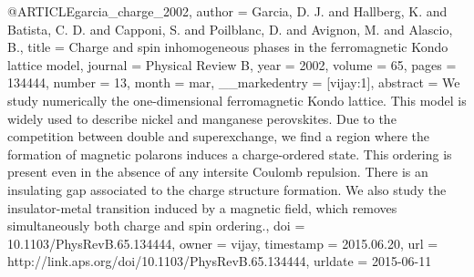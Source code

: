 @ARTICLE{garcia_charge_2002,
  author = {Garcia, D. J. and Hallberg, K. and Batista, C. D. and Capponi, S.
	and Poilblanc, D. and Avignon, M. and Alascio, B.},
  title = {Charge and spin inhomogeneous phases in the ferromagnetic {Kondo}
	lattice model},
  journal = {Physical Review B},
  year = {2002},
  volume = {65},
  pages = {134444},
  number = {13},
  month = mar,
  __markedentry = {[vijay:1]},
  abstract = {We study numerically the one-dimensional ferromagnetic Kondo lattice.
	This model is widely used to describe nickel and manganese perovskites.
	Due to the competition between double and superexchange, we find
	a region where the formation of magnetic polarons induces a charge-ordered
	state. This ordering is present even in the absence of any intersite
	Coulomb repulsion. There is an insulating gap associated to the charge
	structure formation. We also study the insulator-metal transition
	induced by a magnetic field, which removes simultaneously both charge
	and spin ordering.},
  doi = {10.1103/PhysRevB.65.134444},
  owner = {vijay},
  timestamp = {2015.06.20},
  url = {http://link.aps.org/doi/10.1103/PhysRevB.65.134444},
  urldate = {2015-06-11}
}

